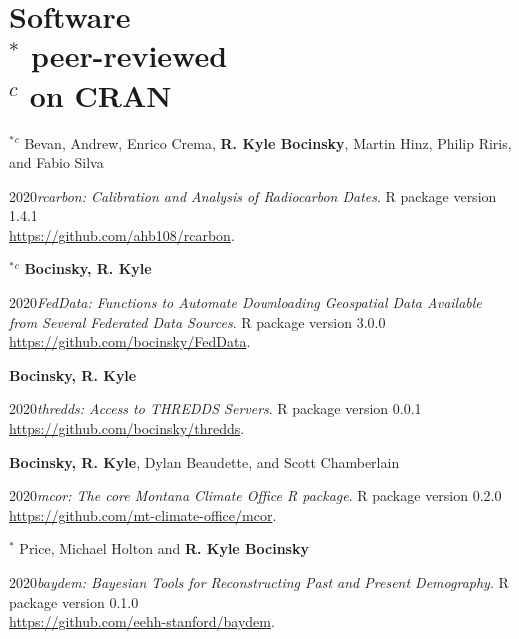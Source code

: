 \section{Software \\ \normalsize{$^\ast$ peer-reviewed} \\ \normalsize{$^c$ on CRAN}}

$^\ast$$^c$ Bevan, Andrew, Enrico Crema, {\bf R. Kyle Bocinsky}, Martin Hinz, Philip Riris, and Fabio Silva
\begin{list1}
\item[] 2020\hspace{.2cm}\emph{rcarbon: Calibration and Analysis of Radiocarbon Dates}. R package version 1.4.1 \\\href{https://github.com/ahb108/rcarbon}{https://github.com/ahb108/rcarbon}.
\end{list1}

$^\ast$$^c$ {\bf Bocinsky, R. Kyle}
\begin{list1}
\item[] 2020\hspace{.2cm}\emph{FedData: Functions to Automate Downloading Geospatial Data Available from
Several Federated Data Sources}. R package version 3.0.0 \\\href{https://github.com/bocinsky/FedData}{https://github.com/bocinsky/FedData}.
\end{list1}

{\bf Bocinsky, R. Kyle}
\begin{list1}
\item[] 2020\hspace{.2cm}\emph{thredds: Access to THREDDS Servers}. R package version 0.0.1 \\\href{https://github.com/bocinsky/thredds}{https://github.com/bocinsky/thredds}.
\end{list1}

{\bf Bocinsky, R. Kyle},  Dylan Beaudette, and Scott Chamberlain
\begin{list1}
\item[] 2020\hspace{.2cm}\emph{mcor: The core Montana Climate Office R package}. R package version 0.2.0 \\\href{https://github.com/mt-climate-office/mcor}{https://github.com/mt-climate-office/mcor}.
\end{list1}

$^\ast$ Price, Michael Holton and {\bf R. Kyle Bocinsky}
\begin{list1}
\item[] 2020\hspace{.2cm}\emph{baydem: Bayesian Tools for Reconstructing Past and Present Demography}. R package version 0.1.0 \\\href{https://github.com/eehh-stanford/baydem}{https://github.com/eehh-stanford/baydem}.
\end{list1}

